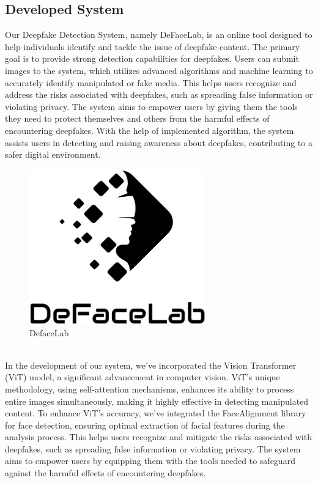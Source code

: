 \subsection{Developed System}

Our Deepfake Detection System, namely DeFaceLab, is an online tool designed to help individuals identify and tackle the issue of deepfake content. The primary goal is to provide strong detection capabilities for deepfakes. Users can submit images to the system, which utilizes advanced algorithms and machine learning to accurately identify manipulated or fake media. This helps users recognize and address the risks associated with deepfakes, such as spreading false information or violating privacy. The system aims to empower users by giving them the tools they need to protect themselves and others from the harmful effects of encountering deepfakes. With the help of implemented algorithm, the system assists users in detecting and raising awareness about deepfakes, contributing to a safer digital environment.\\
\begin{figure}[h]
    \centering
    \includegraphics[width= 3in ]{img/logoblack.png}
    \caption{DefaceLab}
\end{figure}
\\
In the development of our system, we've incorporated the Vision Transformer (ViT) model, a significant advancement in computer vision. ViT's unique methodology, using self-attention mechanisms, enhances its ability to process entire images simultaneously, making it highly effective in detecting manipulated content. To enhance ViT's accuracy, we've integrated the FaceAlignment library for face detection, ensuring optimal extraction of facial features during the analysis process. This helps users recognize and mitigate the risks associated with deepfakes, such as spreading false information or violating privacy. The system aims to empower users by equipping them with the tools needed to safeguard against the harmful effects of encountering deepfakes.